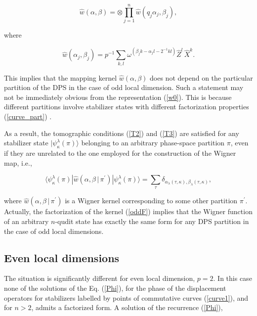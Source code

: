 \documentclass[quantumrep,article,submit,pdftex,moreauthors]{Definitions/mdpi}
\begin{document}
\begin{equation}
  \hat{w}\left( \alpha,\beta \right)
  = \otimes \prod\limits_{j=1}^{n}\hat{w}\left(
    q_{j}\alpha_{j},\beta_{j}
  \right),
  \label{oddF}
\end{equation}

where

\begin{equation*}
  \hat{w}(\alpha_{j},\beta_{j})
  = p^{-1} \sum_{k,l} \omega^{(\beta_{j} k - \alpha_{j} l - 2^{-1} k l)}
  \hat{Z}^{l} \,\hat{X}^{k}.
\end{equation*}

This implies that the mapping kernel $\hat{w}\left( \alpha,\beta \right)$ does
not depend on the particular partition of the DPS in the case of odd local
dimension. Such a statement may not be immediately obvious from the
representation (\ref{w0}). This is because different partitions involve
stabilizer states with different factorization properties (\ref{curve_part})
\cite{Bjork2007}.

As a result, the tomographic conditions (\ref{T2}) and (\ref{T3}) are satisfied
for any stabilizer state $|\psi_{\kappa}^{\lambda}(\pi)\rangle$ belonging to
an arbitrary phase-space partition $\pi $, even if they are unrelated to the one
employed for the construction of the Wigner map, i.e.,

\begin{equation*}
  \langle \psi_{\kappa}^{\lambda}(\pi) |\hat{w} \left(
    \alpha,\beta \, | \, \pi^{\prime}
  \right) |\psi_{\kappa}^{\lambda}(\pi)\rangle
  = \sum_{\tau} \delta_{\alpha_{\lambda}(\tau,\kappa),\beta_{\lambda}(\tau,\kappa)},
\end{equation*}

where $\hat{w}\left( \alpha,\beta \,|\,\pi^{\prime}\right) $ is a Wigner kernel
corresponding to some other partition $\pi^{\prime}$.  Actually, the
factorization of the kernel (\ref{oddF}) implies that the Wigner function of an
arbitrary $n$-qudit state has exactly the same form for any DPS partition in the
case of odd local dimensions.

\subsection{Even local dimensions}

The situation is significantly different for even local dimension, $p=2$. In
this case none of the solutions of the Eq. (\ref{Phi}), for the phase of the
displacement operators for stabilizers labelled by points of commutative curves
(\ref{curve1}), and for $n > 2$, admits a factorized form. A solution of the
recurrence (\ref{Phi}),
\end{document}
